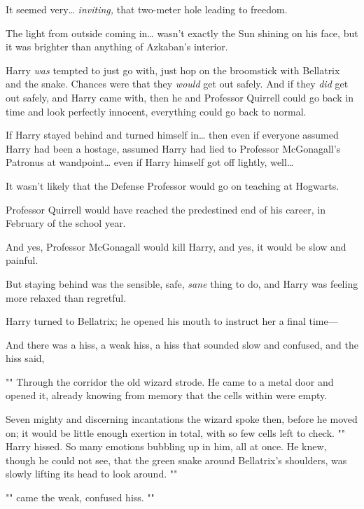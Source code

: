 It seemed very{\ldots} \emph{inviting,} that two-meter hole leading to freedom.

The light from outside coming in{\ldots} wasn't exactly the Sun shining on his
face, but it was brighter than anything of Azkaban's interior.

Harry \emph{was} tempted to just go with, just hop on the broomstick with
Bellatrix and the snake. Chances were that they \emph{would} get out safely.
And if they \emph{did} get out safely, and Harry came with, then he and
Professor Quirrell could go back in time and look perfectly innocent,
everything could go back to normal.

If Harry stayed behind and turned himself in{\ldots} then even if everyone
assumed Harry had been a hostage, assumed Harry had lied to Professor
McGonagall's Patronus at wandpoint{\ldots} even if Harry himself got off
lightly, well{\ldots}

It wasn't likely that the Defense Professor would go on teaching at Hogwarts.

Professor Quirrell would have reached the predestined end of his career, in
February of the school year.

And yes, Professor McGonagall would kill Harry, and yes, it would be slow and
painful.

But staying behind was the sensible, safe, \emph{sane} thing to do, and Harry
was feeling more relaxed than regretful.

Harry turned to Bellatrix; he opened his mouth to instruct her a final time---

And there was a hiss, a weak hiss, a hiss that sounded slow and confused, and
the hiss said,

""
\later
Through the corridor the old wizard strode. He came to a metal door and opened
it, already knowing from memory that the cells within were empty.

Seven mighty and discerning incantations the wizard spoke then, before he moved
on; it would be little enough exertion in total, with so few cells left to
check.
\later
"" Harry hissed. So many emotions bubbling up in him, all at
once. He knew, though he could not see, that the green snake around Bellatrix's
shoulders, was slowly lifting its head to look around. ""

"" came the weak, confused hiss. ""

